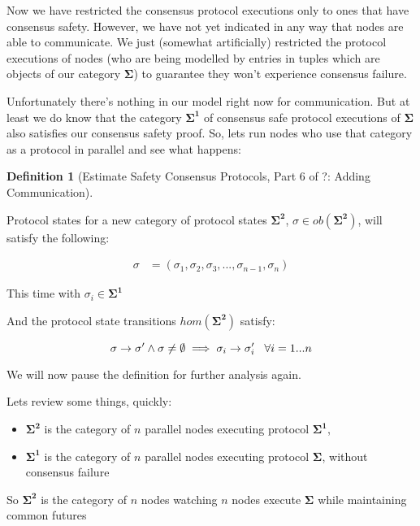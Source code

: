 \documentclass{article}
\theoremstyle{definition}
\newtheorem{defn}{Definition}[section]
\newcommand{\cat}{
	\mathbf
}
\begin{document}
Now we have restricted the consensus protocol executions only to ones that have consensus safety. However, we have not yet indicated in any way that nodes are able to communicate. We just (somewhat artificially) restricted the protocol executions of nodes (who are being modelled by entries in tuples which are objects of our category $\cat{\Sigma}$) to guarantee they won't experience consensus failure.

Unfortunately there's nothing in our model right now for communication. But at least we do know that the category $\cat{\Sigma^1}$ of consensus safe protocol executions of $\cat{\Sigma}$ also satisfies our consensus safety proof. So, lets run nodes who use that category as a protocol in parallel and see what happens:


\begin{defn}[Estimate Safety Consensus Protocols, Part 6 of ?: Adding Communication]
\begin{description}


Protocol states for a new category of protocol states $\cat{\Sigma^2}$, $\sigma \in ob(\cat{\Sigma^2})$, will satisfy the following:

\begin{align*}
  \sigma &= (\sigma_1,\sigma_2,\sigma_3,...,\sigma_{n-1},\sigma_n)
\end{align*}

This time with $\sigma_i \in \cat{\Sigma^1}$

And the protocol state transitions $hom(\cat{\Sigma^2})$ satisfy:

$$
\sigma \to \sigma' \land \sigma \neq \emptyset \implies \sigma_i \to \sigma'_i \hspace{3mm} \forall i=1...n
$$

We will now pause the definition for further analysis again.

\end{description}
\end{defn}

Lets review some things, quickly:

\begin{itemize}
\item $\cat{\Sigma^2}$ is the category of $n$ parallel nodes executing protocol $\cat{\Sigma^1}$,
\item $\cat{\Sigma^1}$ is the category of $n$ parallel nodes executing protocol $\cat{\Sigma}$, without consensus failure
\end{itemize}

So  $\cat{\Sigma^2}$ is the category of $n$ nodes watching $n$ nodes execute $\cat{\Sigma}$ while maintaining common futures
\end{document}
